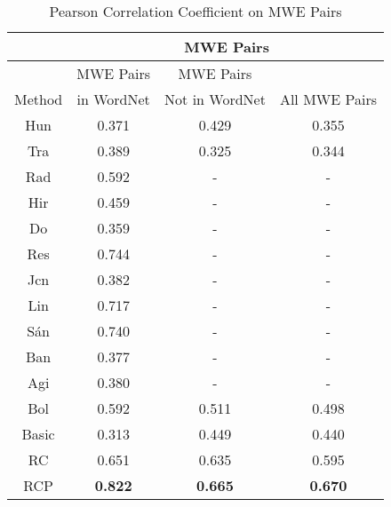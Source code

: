 \begin{table}[th]
\centering
\caption{Pearson Correlation Coefficient on MWE Pairs}
\label{tab:benchmarkData2}
\small{
\begin{tabular}{|c|c|c|c|}\hline
&	\multicolumn{3}{c|}{MWE Pairs}\\\hline
	&	MWE Pairs & MWE Pairs & \\ %
Method	&in WordNet &Not in WordNet & All MWE Pairs \\ \hline\hline %
Hun	&0.371 &0.429&0.355\\ \hline %
Tra	&0.389 &0.325&0.344\\ \hline %
Rad&0.592	&-&-\\ \hline %
Hir	&0.459	&-&-\\ \hline %
Do	&0.359	&-&-\\ \hline %
Res&0.744	&-&-\\ \hline %
Jcn&0.382	&-&-\\ \hline %
Lin&0.717	&-&-\\ \hline %
S\'{a}n&0.740	&-&-\\ \hline %
Ban&0.377	 &-&-\\ \hline %
Agi&0.380	 &-&-\\ \hline %
Bol&0.592 &0.511&0.498\\ \hline %
Basic&0.313	 &0.449&0.440\\ \hline %
RC	&0.651	 &0.635&0.595\\ \hline %
RCP&\textbf{0.822} &\textbf{0.665}&\textbf{0.670}\\ \hline %
\end{tabular}
}
\end{table}

